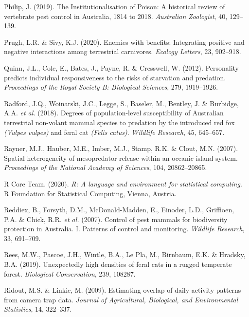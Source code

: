 \documentclass[11pt,a4paper,titlepage,twoside,openright]{style/unimelbthesis}
\begin{document}
\begin{mainmatter}
\leavevmode\hypertarget{ref-philip2019institutionalisation}{}%
Philip, J. (2019). The Institutionalisation of Poison: A historical review of vertebrate pest control in Australia, 1814 to 2018. \emph{Australian Zoologist}, 40, 129--139.

\leavevmode\hypertarget{ref-prugh2020enemies}{}%
Prugh, L.R. \& Sivy, K.J. (2020). Enemies with benefits: Integrating positive and negative interactions among terrestrial carnivores. \emph{Ecology Letters}, 23, 902--918.

\leavevmode\hypertarget{ref-quinn2012personality}{}%
Quinn, J.L., Cole, E., Bates, J., Payne, R. \& Cresswell, W. (2012). Personality predicts individual responsiveness to the risks of starvation and predation. \emph{Proceedings of the Royal Society B: Biological Sciences}, 279, 1919--1926.

\leavevmode\hypertarget{ref-radford2018degrees}{}%
Radford, J.Q., Woinarski, J.C., Legge, S., Baseler, M., Bentley, J. \& Burbidge, A.A. \emph{et al.} (2018). Degrees of population-level susceptibility of Australian terrestrial non-volant mammal species to predation by the introduced red fox \emph{(Vulpes vulpes)} and feral cat \emph{(Felis catus)}. \emph{Wildlife Research}, 45, 645--657.

\leavevmode\hypertarget{ref-rayner2007spatial}{}%
Rayner, M.J., Hauber, M.E., Imber, M.J., Stamp, R.K. \& Clout, M.N. (2007). Spatial heterogeneity of mesopredator release within an oceanic island system. \emph{Proceedings of the National Academy of Sciences}, 104, 20862--20865.

\leavevmode\hypertarget{ref-R}{}%
R Core Team. (2020). \emph{R: A language and environment for statistical computing}. R Foundation for Statistical Computing, Vienna, Austria.

\leavevmode\hypertarget{ref-reddiex2007control}{}%
Reddiex, B., Forsyth, D.M., McDonald-Madden, E., Einoder, L.D., Griffioen, P.A. \& Chick, R.R. \emph{et al.} (2007). Control of pest mammals for biodiversity protection in Australia. I. Patterns of control and monitoring. \emph{Wildlife Research}, 33, 691--709.

\leavevmode\hypertarget{ref-rees2019unexpectedly}{}%
Rees, M.W., Pascoe, J.H., Wintle, B.A., Le Pla, M., Birnbaum, E.K. \& Hradsky, B.A. (2019). Unexpectedly high densities of feral cats in a rugged temperate forest. \emph{Biological Conservation}, 239, 108287.

\leavevmode\hypertarget{ref-ridout2009estimating}{}%
Ridout, M.S. \& Linkie, M. (2009). Estimating overlap of daily activity patterns from camera trap data. \emph{Journal of Agricultural, Biological, and Environmental Statistics}, 14, 322--337.


\end{mainmatter}
\end{document}
